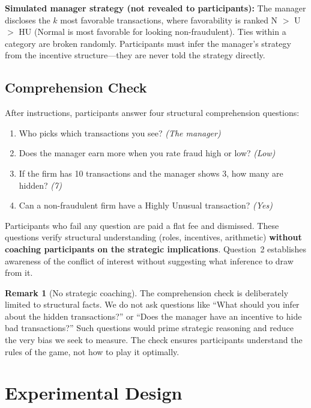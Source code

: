 \documentclass[12pt]{article}
\theoremstyle{definition}
\newtheorem{remark}{Remark}
\begin{document}
\textbf{Simulated manager strategy (not revealed to participants):} The manager discloses the $k$ most favorable transactions, where favorability is ranked N $>$ U $>$ HU (Normal is most favorable for looking non-fraudulent). Ties within a category are broken randomly. Participants must infer the manager's strategy from the incentive structure---they are never told the strategy directly.

\subsection{Comprehension Check}

After instructions, participants answer four structural comprehension questions:

\begin{enumerate}[nosep]
\item Who picks which transactions you see? \textit{(The manager)}
\item Does the manager earn more when you rate fraud high or low? \textit{(Low)}
\item If the firm has 10 transactions and the manager shows 3, how many are hidden? \textit{(7)}
\item Can a non-fraudulent firm have a Highly Unusual transaction? \textit{(Yes)}
\end{enumerate}

Participants who fail any question are paid a flat fee and dismissed. These questions verify structural understanding (roles, incentives, arithmetic) \textbf{without coaching participants on the strategic implications}. Question~2 establishes awareness of the conflict of interest without suggesting what inference to draw from it.

\begin{remark}[No strategic coaching]
The comprehension check is deliberately limited to structural facts. We do not ask questions like ``What should you infer about the hidden transactions?'' or ``Does the manager have an incentive to hide bad transactions?'' Such questions would prime strategic reasoning and reduce the very bias we seek to measure. The check ensures participants understand the rules of the game, not how to play it optimally.
\end{remark}


\section{Experimental Design}
\label{sec:design}
\end{document}
